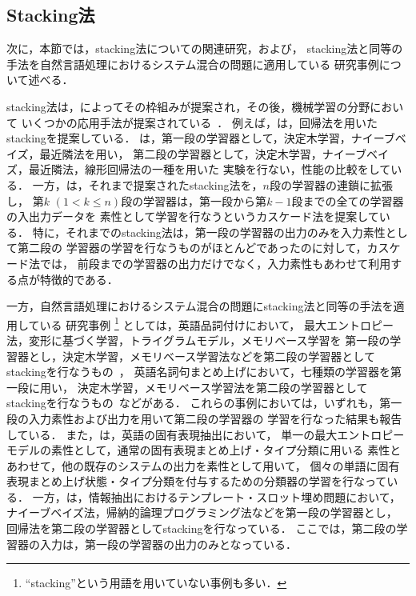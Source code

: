 \subsection{Stacking法}

次に，本節では，stacking法についての関連研究，および，
stacking法と同等の手法を自然言語処理におけるシステム混合の問題に適用している
研究事例について述べる．

stacking法は，\cite{Wolpert92a}によってその枠組みが提案され，その後，機械学習の分野において
いくつかの応用手法が提案されている~\cite{Breiman96a,Ting97a,Gama00a}．
例えば，\cite{Breiman96a}は，回帰法を用いたstackingを提案している．
\cite{Ting97a}は，第一段の学習器として，決定木学習，ナイーブベイズ，最近隣法を用い，
第二段の学習器として，決定木学習，ナイーブベイズ，最近隣法，線形回帰法の一種を用いた
実験を行ない，性能の比較をしている．
一方，\cite{Gama00a}は，それまで提案されたstacking法を，$n$段の学習器の連鎖に拡張し，
第$k$ $(1<k\leq n)$段の学習器は，第一段から第$k-1$段までの全ての学習器の入出力データを
素性として学習を行なうというカスケード法を提案している．
特に，それまでのstacking法は，第一段の学習器の出力のみを入力素性として第二段の
学習器の学習を行なうものがほとんどであったのに対して，カスケード法では，
前段までの学習器の出力だけでなく，入力素性もあわせて利用する点が特徴的である．

一方，自然言語処理におけるシステム混合の問題にstacking法と同等の手法を適用している
研究事例
\footnote{
  ``stacking''という用語を用いていない事例も多い．
}
としては，英語品詞付けにおいて，
最大エントロピー法，変形に基づく学習，トライグラムモデル，メモリベース学習を
第一段の学習器とし，決定木学習，メモリベース学習法などを第二段の学習器として
stackingを行なうもの~\cite{Brill98a,vanHalteren98a}，
英語名詞句まとめ上げにおいて，七種類の学習器を第一段に用い，
決定木学習，メモリベース学習法を第二段の学習器として
stackingを行なうもの~\cite{Sang00a}などがある．
これらの事例においては，いずれも，第一段の入力素性および出力を用いて第二段の学習器の
学習を行なった結果も報告している．
また，\cite{Borthwick98a}は，英語の固有表現抽出において，
単一の最大エントロピーモデルの素性として，通常の固有表現まとめ上げ・タイプ分類に用いる
素性とあわせて，他の既存のシステムの出力を素性として用いて，
個々の単語に固有表現まとめ上げ状態・タイプ分類を付与するための分類器の学習を行なっている．
一方，\cite{Freitag00a}は，情報抽出におけるテンプレート・スロット埋め問題において，
ナイーブベイズ法，帰納的論理プログラミング法などを第一段の学習器とし，
回帰法を第二段の学習器としてstackingを行なっている．
ここでは，第二段の学習器の入力は，第一段の学習器の出力のみとなっている．

